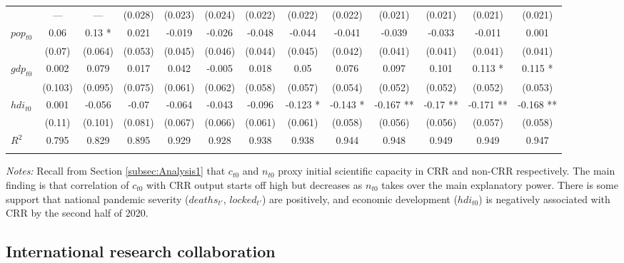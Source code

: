 {\begin{landscape}
\begin{table}
\begin{threeparttable}
\begin{small}
\begin{tabular}{lcccccccccccc}
   & --- & --- & (0.028) & (0.023) & (0.024) & (0.022) & (0.022) & (0.022) & (0.021) & (0.021) & (0.021) & (0.021) \\ 
  $pop_{t0}$ & 0.06   & 0.13 *  & 0.021   & -0.019   & -0.026   & -0.048   & -0.044   & -0.041   & -0.039   & -0.033   & -0.011   & 0.001   \\ 
   & (0.07) & (0.064) & (0.053) & (0.045) & (0.046) & (0.044) & (0.045) & (0.042) & (0.041) & (0.041) & (0.041) & (0.041) \\ 
  $gdp_{t0}$ & 0.002   & 0.079   & 0.017   & 0.042   & -0.005   & 0.018   & 0.05   & 0.076   & 0.097   & 0.101   & 0.113 *  & 0.115 *  \\ 
   & (0.103) & (0.095) & (0.075) & (0.061) & (0.062) & (0.058) & (0.057) & (0.054) & (0.052) & (0.052) & (0.052) & (0.053) \\ 
  $hdi_{t0}$ & 0.001   & -0.056   & -0.07   & -0.064   & -0.043   & -0.096   & -0.123 *  & -0.143 *  & -0.167 **  & -0.17 **  & -0.171 **  & -0.168 **  \\ 
   & (0.11) & (0.101) & (0.081) & (0.067) & (0.066) & (0.061) & (0.061) & (0.058) & (0.056) & (0.056) & (0.057) & (0.058) \\ 
\noalign{\smallskip}\hline\noalign{\smallskip}
  $R^2$ & 0.795 & 0.829 & 0.895 & 0.929 & 0.928 & 0.938 & 0.938 & 0.944 & 0.948 & 0.949 & 0.949 & 0.947 \\ 
\noalign{\smallskip}\hline\noalign{\smallskip}
\end{tabular}
  \end{small}
    \begin{tablenotes}
  \footnotesize
  \item {\it Notes:} Recall from Section \ref{subsec:Analysis1} that $c_{t0}$ and $n_{t0}$ proxy initial scientific capacity in CRR and non-CRR respectively. The main finding is that correlation of $c_{t0}$ with CRR output starts off high but decreases as $n_{t0}$ takes over the main explanatory power. There is some support that national pandemic severity ($deaths_{t'}$, $locked_{t'}$) are positively, and economic development ($hdi_{t0}$) is negatively associated with CRR by the second half of 2020.
    \end{tablenotes}
  \end{threeparttable}
\end{table}
\hfill
\end{landscape}}


\subsection{International research collaboration}
\label{sec:IRC}


